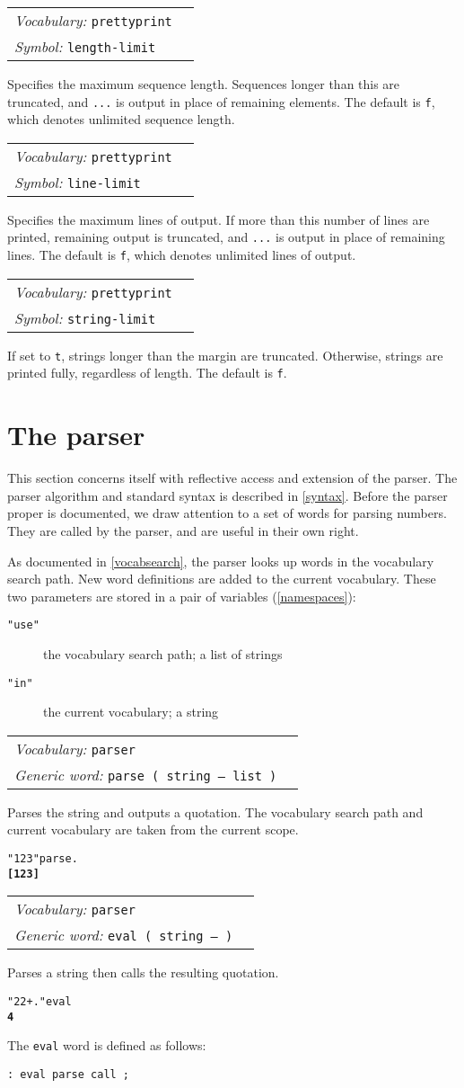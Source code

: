 \documentclass{book}
\newcommand{\vocabulary}[1]{\emph{Vocabulary:} \texttt{#1}&\\}
\newcommand{\symbolword}[1]{\index{\texttt{#1}}\emph{Symbol:} \texttt{#1}&\\}
\newcommand{\genericword}[2]{\index{\texttt{#1}}\emph{Generic word:} \texttt{#2}&\\}
\newcommand{\wordtable}[1]{


\begin{tabularx}{12cm}{lX}
\hline
#1
\hline
\end{tabularx}

}
\begin{document}
\wordtable{
\vocabulary{prettyprint}
\symbolword{length-limit}
}
Specifies the maximum sequence length. Sequences longer than this are truncated, and \verb|...| is output in place of remaining elements. The default is \texttt{f}, which denotes unlimited sequence length.

\wordtable{
\vocabulary{prettyprint}
\symbolword{line-limit}
}
Specifies the maximum lines of output. If more than this number of lines are printed, remaining output is truncated, and \verb|...| is output in place of remaining lines. The default is \texttt{f}, which denotes unlimited lines of output.

\wordtable{
\vocabulary{prettyprint}
\symbolword{string-limit}
}
If set to \verb|t|, strings longer than the margin are truncated. Otherwise, strings are printed fully, regardless of length. The default is \verb|f|.

\chapter{The parser}\label{parser-chapter}

This section concerns itself with reflective access and extension of the parser. The parser algorithm and standard syntax is described in \ref{syntax}. Before the parser proper is documented, we draw attention to a set of words for parsing numbers. They are called by the parser, and are useful in their own right.

As documented in \ref{vocabsearch}, the parser looks up words in the vocabulary search path. New word definitions are added to the current vocabulary. These two parameters are stored in a pair of variables (\ref{namespaces}):
\begin{description}
\item[\texttt{"use"}] the vocabulary search path; a list of strings
\item[\texttt{"in"}] the current vocabulary; a string
\end{description}

\wordtable{
\vocabulary{parser}
\genericword{parse}{parse~( string -- list )}
}
Parses the string and outputs a quotation. The vocabulary search path and current vocabulary are taken from the current scope.
\begin{alltt}
  "1 2 3" parse .
\textbf{[ 1 2 3 ]}
\end{alltt}

\wordtable{
\vocabulary{parser}
\genericword{eval}{eval~( string -- )}
}
Parses a string then calls the resulting quotation.
\begin{alltt}
  "2 2 + ." eval
\textbf{4}
\end{alltt}
The \texttt{eval} word is defined as follows:
\begin{verbatim}
: eval parse call ;
\end{verbatim}
\end{document}
